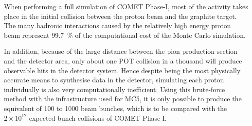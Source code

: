 When performing a full simulation of COMET Phase-I, most of the activity takes place in the initial collision between the proton beam and the graphite target. The many hadronic interactions caused by the relatively high energy proton beam represent \SI{99.7}{\percent} of the computational cost of the Monte Carlo simulation.

In addition, because of the large distance between the pion production section and the detector area, only about one POT collision in a thousand will produce observable hits in the detector system. Hence despite being the most physically accurate means to synthesise data in the detector, simulating each proton individually is also very computationally inefficient. Using this brute-force method with the infrastructure used for MC5, it is only possible to produce the equivalent of 100 to 1000 beam bunches, which is to be compared with the $2\times 10^{12}$ expected bunch collisions of COMET Phase-I.




